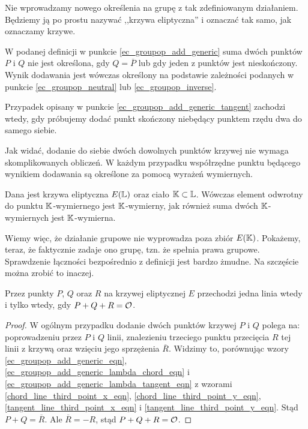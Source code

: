 \begin{remark}
Nie wprowadzamy nowego określenia na grupę z tak zdefiniowanym działaniem.
Będziemy ją po prostu nazywać ,,krzywa eliptyczna''
i oznaczać tak samo, jak oznaczamy krzywe.
\end{remark}

\begin{remark}
W podanej definicji w punkcie \ref{ec_groupop_add_generic}
suma dwóch punktów $P$ i $Q$
nie jest określona, gdy $Q = \overline{P}$
lub gdy jeden z punktów jest nieskończony.
Wynik dodawania jest wówczas określony
na podstawie zależności podanych w punkcie
\ref{ec_groupop_neutral} lub \ref{ec_groupop_inverse}.
\end{remark}

\begin{remark}
Przypadek opisany w punkcie \ref{ec_groupop_add_generic_tangent}
zachodzi wtedy,
gdy próbujemy dodać punkt skończony niebędący punktem rzędu dwa
do samego siebie.
\end{remark}

Jak widać, dodanie do siebie dwóch dowolnych punktów krzywej
nie wymaga skomplikowanych obliczeń.
W każdym przypadku współrzędne punktu będącego wynikiem dodawania
są określone za pomocą wyrażeń wymiernych.

\begin{fact}
Dana jest krzywa eliptyczna $E(\mathbb{L})$ oraz ciało $\mathbb{K} \subset \mathbb{L}$.
Wówczas element odwrotny do punktu $\mathbb{K}$-wymiernego
jest $\mathbb{K}$-wymierny,
jak również suma dwóch $\mathbb{K}$-wymiernych jest $\mathbb{K}$-wymierna.
\end{fact}

Wiemy więc, że działanie grupowe nie wyprowadza poza zbiór $E(\mathbb{K})$.
Pokażemy, teraz, że faktycznie zadaje ono grupę,
tzn. że spełnia prawa grupowe.
Sprawdzenie łączności bezpośrednio z definicji jest bardzo żmudne.
Na szczęście można zrobić to inaczej.

\begin{lemma}
Przez punkty $P$, $Q$ oraz $R$ na krzywej eliptycznej $E$
przechodzi jedna linia wtedy i tylko wtedy,
gdy $P + Q + R = \mathcal{O}$.
\end{lemma}

\begin{proof}
W ogólnym przypadku dodanie dwóch punktów krzywej $P$ i $Q$ polega na:
poprowadzeniu przez $P$ i $Q$ linii,
znalezieniu trzeciego punktu przecięcia $R$ tej linii z krzywą
oraz wzięciu jego sprzężenia $\overline{R}$.
Widzimy to, porównując wzory
\ref{ec_groupop_add_generic_eqn},
\ref{ec_groupop_add_generic_lambda_chord_eqn}
i \ref{ec_groupop_add_generic_lambda_tangent_eqn}
z wzorami
\ref{chord_line_third_point_x_eqn},
\ref{chord_line_third_point_y_eqn},
\ref{tangent_line_third_point_x_eqn}
i \ref{tangent_line_third_point_y_eqn}.
Stąd $P + Q = \overline{R}$.
Ale $\overline{R} = -R$, stąd $P + Q + R = \mathcal{O}$.
\end{proof}

